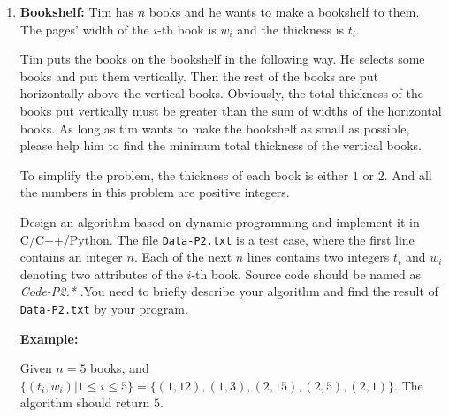 \documentclass{article}
\begin{document}
\begin{enumerate}
~\\
~\\
    \item 
    \textbf{Bookshelf: }Tim has $n$ books and he wants to make a bookshelf to them. The pages' width of the $i$-th book is $w_i$ and the thickness is $t_i$. 

    Tim puts the books on the bookshelf in the following way. He selects some books and put them vertically. Then the rest of the books are put horizontally above the vertical books. Obviously, the total thickness of the books put vertically must be greater than the sum of widths of the horizontal books. As long as tim wants to make the bookshelf as small as possible, please help him to find the minimum total thickness of the vertical books.

    To simplify the problem, the thickness of each book is either $1$ or $2$. And all the numbers in this problem are positive integers.

    Design an algorithm based on dynamic programming and implement it in C/C++/Python. The file \texttt{Data-P2.txt} is a test case, where the first line contains an integer $n$. Each of the next $n$ lines contains two integers $t_i$ and $w_i$ denoting two attributes of the $i$-th book. Source code should be named as
    {\color{red}\emph{Code-P2.*}} .You need to briefly describe your algorithm and find the result of \texttt{Data-P2.txt} by your program.

    \textbf{Example:}

    Given $n=5$ books, and $\{(t_i,w_i)|1\leq i \leq 5\} = \{(1,12),(1,3),(2,15),(2,5),(2,1)\}$. The algorithm should return $5$.


\end{enumerate}
\end{document}
